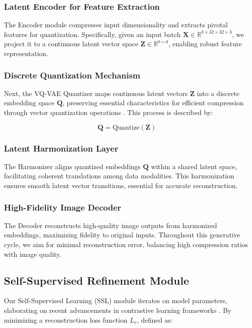 \documentclass{article} %
\begin{document}
\subsubsection{Latent Encoder for Feature Extraction}

The Encoder module compresses input dimensionality and extracts pivotal features for quantization. Specifically, given an input batch $\mathbf{X} \in \mathbb{R}^{b \times 32 \times 32 \times 3}$, we project it to a continuous latent vector space $\mathbf{Z} \in \mathbb{R}^{b \times d}$, enabling robust feature representation.

\subsubsection{Discrete Quantization Mechanism}

Next, the VQ-VAE Quantizer maps continuous latent vectors $\mathbf{Z}$ into a discrete embedding space $\mathbf{Q}$, preserving essential characteristics for efficient compression through vector quantization operations \citep{oord2017neural}. This process is described by:

\[
\mathbf{Q} = \text{Quantize}(\mathbf{Z})
\]

\subsubsection{Latent Harmonization Layer}

The Harmonizer aligns quantized embeddings $\mathbf{Q}$ within a shared latent space, facilitating coherent translations among data modalities. This harmonization ensures smooth latent vector transitions, essential for accurate reconstruction.

\subsubsection{High-Fidelity Image Decoder}

The Decoder reconstructs high-quality image outputs from harmonized embeddings, maximizing fidelity to original inputs. Throughout this generative cycle, we aim for minimal reconstruction error, balancing high compression ratios with image quality.

\subsection{Self-Supervised Refinement Module}

Our Self-Supervised Learning (SSL) module iterates on model parameters, elaborating on recent advancements in contrastive learning frameworks \citep{chen2020simple}. By minimizing a reconstruction loss function $L_r$, defined as:
\end{document}
